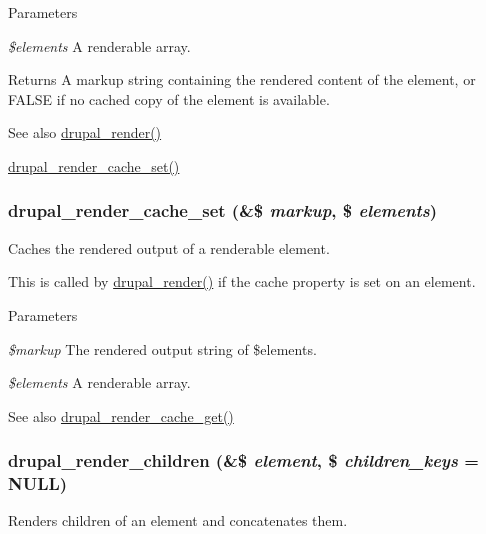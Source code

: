 \begin{DoxyParams}{Parameters}
\item[{\em \$elements}]A renderable array.\end{DoxyParams}
\begin{DoxyReturn}{Returns}
A markup string containing the rendered content of the element, or FALSE if no cached copy of the element is available.
\end{DoxyReturn}
\begin{DoxySeeAlso}{See also}
\hyperlink{common_8inc_a05798b44e8d6c496d4bee5cc32fa7851}{drupal\_\-render()} 

\hyperlink{common_8inc_aee3169994180319d0fe2b1738825c54c}{drupal\_\-render\_\-cache\_\-set()} 
\end{DoxySeeAlso}
\hypertarget{common_8inc_aee3169994180319d0fe2b1738825c54c}{
\subsubsection[{drupal\_\-render\_\-cache\_\-set}]{\setlength{\rightskip}{0pt plus 5cm}drupal\_\-render\_\-cache\_\-set (\&\$ {\em markup}, \/  \$ {\em elements})}}
\label{common_8inc_aee3169994180319d0fe2b1738825c54c}
Caches the rendered output of a renderable element.

This is called by \hyperlink{common_8inc_a05798b44e8d6c496d4bee5cc32fa7851}{drupal\_\-render()} if the cache property is set on an element.


\begin{DoxyParams}{Parameters}
\item[{\em \$markup}]The rendered output string of \$elements. \item[{\em \$elements}]A renderable array.\end{DoxyParams}
\begin{DoxySeeAlso}{See also}
\hyperlink{common_8inc_a8726783745547f4686cea624be0b0562}{drupal\_\-render\_\-cache\_\-get()} 
\end{DoxySeeAlso}
\hypertarget{common_8inc_aa0cac24bf2aa19237fd012fea704b8ac}{
\subsubsection[{drupal\_\-render\_\-children}]{\setlength{\rightskip}{0pt plus 5cm}drupal\_\-render\_\-children (\&\$ {\em element}, \/  \$ {\em children\_\-keys} = {\ttfamily NULL})}}
\label{common_8inc_aa0cac24bf2aa19237fd012fea704b8ac}
Renders children of an element and concatenates them.

